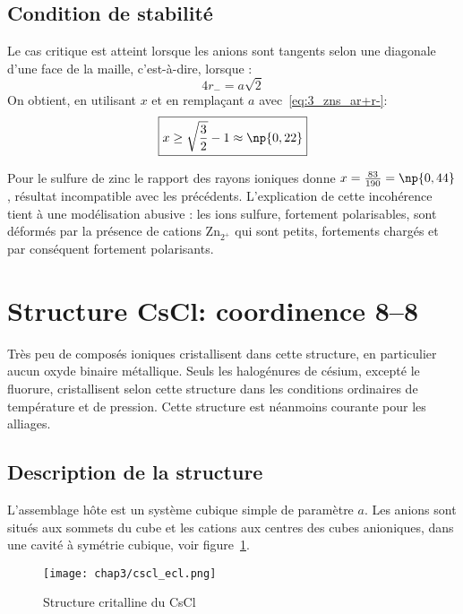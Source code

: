 \subsection{Condition de stabilité}
Le cas critique est atteint lorsque les anions sont tangents
selon une diagonale d'une face de la maille, c'est-à-dire,
lorsque :
\begin{equation}
    4r_- = a\sqrt{2}
\end{equation}
On obtient, en utilisant $x$ et en remplaçant $a$ avec~\ref{eq:3_zns_ar+r-}:
\begin{equation}
     \boxed{x \geq \sqrt{\frac{3}{2}} - 1 \approx \np{0,22}}
    \label{eq:3_zns_stab}
\end{equation}
\begin{rem}
    Pour le sulfure de zinc le rapport des rayons ioniques donne
    $x = \frac{83}{190} = \np{0,44}$, résultat incompatible avec les précédents.
    L'explication de cette incohérence tient à une
    modélisation abusive : les ions sulfure, fortement polarisables, sont déformés 
    par la présence de cations Zn$_{2^+}$ qui sont petits, fortements chargés et 
    par conséquent fortement polarisants.
\end{rem}



\section{Structure CsCl: coordinence 8\---8}
Très peu de composés ioniques cristallisent dans cette structure, en particulier 
aucun oxyde binaire métallique. Seuls les halogénures de césium, excepté le fluorure,
cristallisent selon cette structure dans les conditions ordinaires de température et de
pression. Cette structure est néanmoins courante pour les alliages.


\subsection{Description de la structure}
L'assemblage hôte est un système cubique simple de paramètre $a$. Les anions sont
situés aux sommets du cube et les cations aux centres des cubes anioniques, dans une
cavité à symétrie cubique, voir figure~\ref{fig:3_cscl_struct}.
\begin{figure}
    \centering
    \texttt{[image: chap3/cscl\_ecl.png]}
    \caption{Structure critalline du CsCl}\label{fig:3_cscl_struct}
\end{figure}


